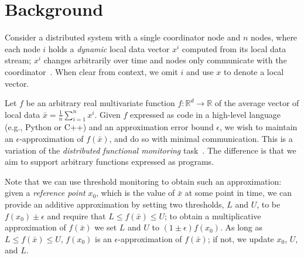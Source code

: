 \section{Background} \label{sec:background}

Consider a distributed system with a single coordinator node and $n$ nodes, where each node $i$ holds a \emph{dynamic} local data vector $x^i$ computed from its local data stream; $x^i$ changes arbitrarily over time and nodes only communicate with the coordinator\footnotemark{}~\cite{cormode2013}.
When clear from context, we omit $i$ and use $x$ to denote a local vector.


Let $f$ be an arbitrary real multivariate function $f :\mathbb{R}^d \to \mathbb{R}$ of the average vector of local data $\bar{x} = \frac{1}{n} \sum_{i=1}^{n} x^i$.
Given $f$ expressed as code in a high-level language (e.g., Python or C++) and an approximation error bound $\epsilon$, we wish to maintain an $\epsilon$-approximation of $f(\bar{x})$, and do so with minimal communication.
%
This is a variation of the \emph{distributed functional monitoring} task~\cite{woodruff2012}.\footnotemark{}
The difference is that we aim to support arbitrary functions expressed as programs.



Note that we can use threshold monitoring to obtain such an approximation: given a \emph{reference point} $x_0$, which is the value of $\bar{x}$ at some point in time, we can provide an additive approximation by setting two thresholds, $L$ and $U$, to be $f(x_0) \pm\epsilon$ and require that $L \le f(\bar{x}) \le U$;
to obtain a multiplicative approximation of $f(\bar{x})$ we set $L$ and $U$ to $(1\pm\epsilon)f(x_0)$.
As long as $L \le f(\bar{x}) \le U$, $f(x_0)$ is an $\epsilon$-approximation of $f(\bar{x})$; if not, we update $x_0$, $U$, and $L$.

